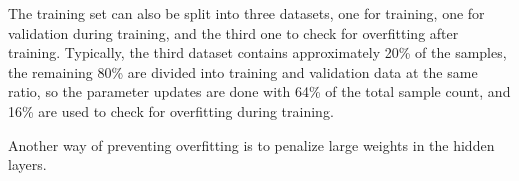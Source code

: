 The training set can also be split into three datasets, one for training, one for validation during training, and the third one to check for overfitting after training. Typically, the third dataset contains approximately 20\% of the samples, the remaining 80\% are divided into training and validation data at the same ratio, so the parameter updates are done with 64\% of the total sample count, and 16\% are used to check for overfitting during training.

Another way of preventing overfitting is to penalize large weights in the hidden layers.